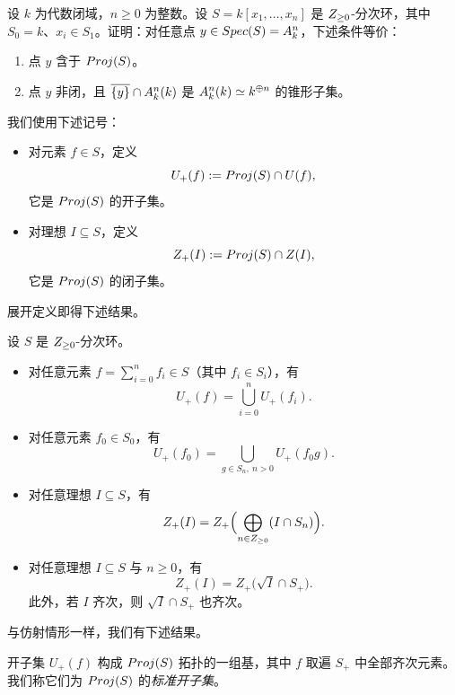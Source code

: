 \begin{exercise}\label{exc:25.1.3}
设 $k$ 为代数闭域，$n \ge 0$ 为整数。设 $S = k[x_1, \dots, x_n]$ 是 $Z_{\ge 0}$-分次环，其中 $S_0 = k$、$x_i \in S_1$。证明：对任意点 $y \in Spec(S) = A^n_k$，下述条件等价：
\begin{enumerate}[label=(\arabic*),leftmargin=2.4em,itemsep=0.25ex]
  \item 点 $y$ 含于 $Proj(S)$。
  \item 点 $y$ 非闭，且 $\overline{\{y\}} \cap A^n_k(k)$ 是 $A^n_k(k) \simeq k^{\oplus n}$ 的锥形子集。
\end{enumerate}
\end{exercise}

\begin{notation}\label{not:25.1.4}
我们使用下述记号：
\begin{itemize}[leftmargin=2em,itemsep=0.25ex]
  \item 对元素 $f \in S$，定义
  \[
  U_+(f) := Proj(S) \cap U(f),
  \]
  它是 $Proj(S)$ 的开子集。
  \item 对理想 $I \subseteq S$，定义
  \[
  Z_+(I) := Proj(S) \cap Z(I),
  \]
  它是 $Proj(S)$ 的闭子集。
\end{itemize}
\end{notation}

展开定义即得下述结果。

\begin{lemma}\label{lem:25.1.5}
设 $S$ 是 $Z_{\ge 0}$-分次环。
\begin{itemize}[leftmargin=2em,itemsep=0.25ex]
  \item 对任意元素 $f = \sum_{i=0}^n f_i \in S$（其中 $f_i \in S_i$），有
  \[
  U_+(f) = \bigcup_{i=0}^n U_+(f_i).
  \]
  \item 对任意元素 $f_0 \in S_0$，有
  \[
  U_+(f_0) = \bigcup_{g \in S_n,\ n>0} U_+(f_0 g).
  \]
  \item 对任意理想 $I \subseteq S$，有
  \[
  Z_+(I) = Z_+\Bigl(\bigoplus_{n \in Z_{\ge 0}} (I \cap S_n)\Bigr).
  \]
  \item 对任意理想 $I \subseteq S$ 与 $n \ge 0$，有
  \[
  Z_+(I) = Z_+\bigl(\sqrt{I} \cap S_+\bigr).
  \]
  此外，若 $I$ 齐次，则 $\sqrt{I} \cap S_+$ 也齐次。
\end{itemize}
\end{lemma}

与仿射情形一样，我们有下述结果。

\begin{corollary}\label{cor:25.1.6}
开子集 $U_+(f)$ 构成 $Proj(S)$ 拓扑的一组基，其中 $f$ 取遍 $S_+$ 中全部齐次元素。我们称它们为 $Proj(S)$ 的\emph{标准开子集}。
\end{corollary}

